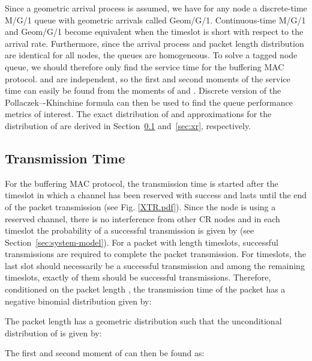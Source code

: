 \documentclass[12pt,journal,oneside,onecolumn]{IEEEtran}
\begin{document}
Since a geometric arrival process is assumed, we have for any 
node a discrete-time M/G/1 queue with geometric arrivals called Geom/G/1. Continuous-time M/G/1 and Geom/G/1 become equivalent when the timeslot is short with 
respect to the arrival rate. 
Furthermore, since 
the arrival process and packet length distribution are identical for all nodes, 
the queues are homogeneous. To solve a tagged node queue, we should therefore only find 
the service time  for the buffering MAC protocol.  and  are independent, 
so the first and second moments of the service time  can easily be found from the moments of  and . 
Discrete version of the {Pollaczek–-Khinchine} formula \cite{takagi93-2} can then be used to find the queue performance metrics of interest.
The exact distribution of  and approximations for the distribution of  are derived in Section~\ref{sec:tx} and~\ref{sec:xr}, respectively. 


\subsection{Transmission Time}
\label{sec:tx}
For the buffering MAC protocol, the transmission time is started after the timeslot in which a channel has been reserved with success and lasts
until  the end of the packet transmission (see Fig. \ref{XTR.pdf}).
Since the node is using a reserved channel, there is no interference from other CR nodes and in each timeslot the probability of
a successful transmission is given by  (see Section~\ref{sec:system-model}).
For a packet with length  timeslots,  successful transmissions are required to complete
the packet transmission. For  timeslots, the last slot should necessarily be a successful transmission and
among the remaining  timeslots, exactly  of them should be successful transmissions. Therefore, conditioned on the packet length ,
the transmission time of the packet    has a negative binomial distribution 
given by:

The packet length  has a geometric distribution such that 
the unconditional distribution of  is given by:

The first and second moment of  can then be found as:
\end{document}
